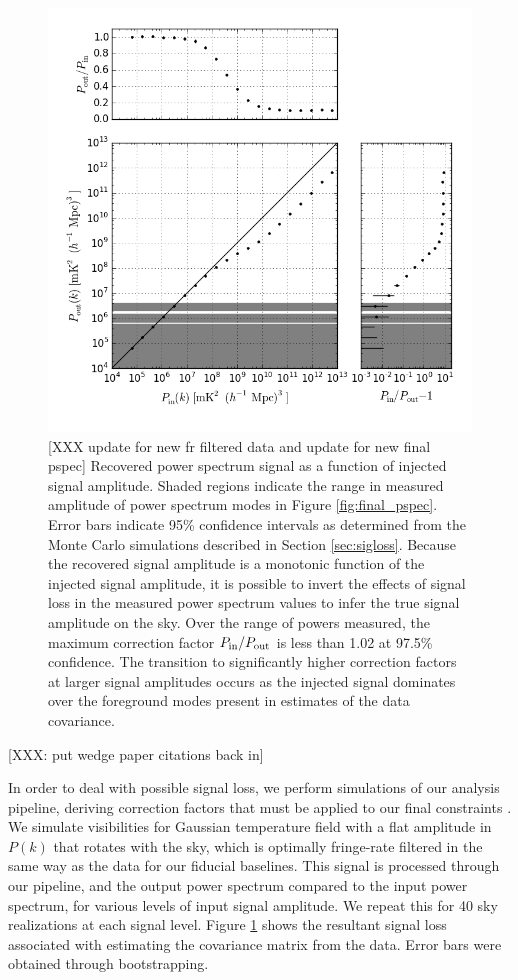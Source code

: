 \documentclass[twocolumn,numberedappendix]{emulateapj} \shorttitle{PSA64}
\begin{document}
\begin{figure}
\centering
\includegraphics[width=\columnwidth]{plots/sigloss.png}
\caption{
[XXX update for new fr filtered data and update for new final pspec]
Recovered power spectrum signal as a function of injected signal amplitude.  Shaded regions
indicate the range in measured amplitude of power spectrum modes in Figure \ref{fig:final_pspec}.  
Error bars indicate 95\% confidence intervals as determined from the Monte Carlo simulations
described in Section \ref{sec:sigloss}.
Because
the recovered signal amplitude is a monotonic function of the injected signal amplitude,
it is possible to invert the effects of signal loss in the measured power spectrum values
to infer the true signal amplitude on the sky. Over the range of powers measured, the 
maximum correction factor $P_{\rm in}/P_{\rm out}$ is less than 1.02 at 97.5\% confidence.
The transition to significantly higher correction factors at larger signal amplitudes
occurs as the injected signal
dominates over the foreground modes present in estimates of the data covariance.
}\label{fig:signal_loss}
\end{figure}

[XXX: put wedge paper citations back in]

In order to deal with possible signal loss, we perform simulations of our analysis pipeline, 
deriving correction factors that must be applied to our final constraints . We simulate visibilities for
Gaussian temperature field with a flat amplitude in $P(k)$ that rotates with the
sky, which is optimally fringe-rate filtered in the same way as the data for our fiducial baselines. This signal is processed through our pipeline, and the output power spectrum compared to the input
power spectrum, for various levels of input signal amplitude.
We repeat this for 40 sky realizations at each signal level.  Figure
\ref{fig:signal_loss} shows the resultant signal loss associated with
estimating the covariance matrix from the data.  Error bars were obtained
through bootstrapping.
\end{document}
